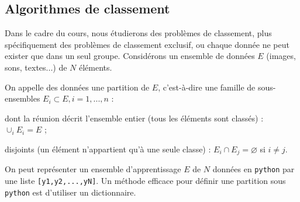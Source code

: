 \documentclass[12pt,fancy]{cours}
\begin{document}




\subsection{Algorithmes de classement}
\label{sec:classif}

Dans le cadre du cours, nous étudierons des problèmes de classement, plus spécifiquement des problèmes de classement exclusif, ou chaque donnée ne peut exister que dans un seul groupe. 
Considérons un ensemble de données $E$ (images, sons, textes...) de $N$ éléments.

\begin{definition}[Classification]
On appelle  des données une partition de $E$, c'est-à-dire une famille de sous-ensembles $E_i \subset E, i=1,...,n$ :
\begin{liste}
\item dont la réunion décrit l'ensemble entier (tous les éléments sont classés) : $\displaystyle\cup_{i} E_i = E$ ;
\item disjoints (un élément n'appartient qu'à une seule classe) : $E_i \cap E_j = \varnothing$ si $i\neq j$.
\end{liste}
\end{definition}

On peut représenter un ensemble d'apprentissage $E$ de $N$ données en \texttt{python} par une liste \texttt{[y1,y2,...,yN]}.
Un méthode efficace pour définir une partition sous \texttt{python} est d'utiliser un dictionnaire.
\end{document}
